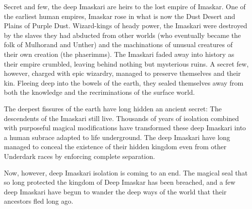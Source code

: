 
Secret and few, the deep Imaskari are heirs to the lost empire of Imaskar. One of the earliest human empires, Imaskar rose in what is now the Dust Desert and Plains of Purple Dust. Wizard-kings of heady power, the Imaskari were destroyed by the slaves they had abducted from other worlds (who eventually became the folk of Mulhorand and Unther) and the machinations of unusual creatures of their own creation (the phaerimms). The Imaskari faded away into history as their empire crumbled, leaving behind nothing but mysterious ruins. A secret few, however, charged with epic wizardry, managed to preserve themselves and their kin. Fleeing deep into the bowels of the earth, they sealed themselves away from both the knowledge and the recriminations of the surface world.

The deepest fissures of the earth have long hidden an ancient secret: The descendents of the Imaskari still live. Thousands of years of isolation combined with purposeful magical modifications have transformed these deep Imaskari into a human subrace adapted to life underground. The deep Imaskari have long managed to conceal the existence of their hidden kingdom even from other Underdark races by enforcing complete separation.

Now, however, deep Imaskari isolation is coming to an end. The magical seal that so long protected the kingdom of Deep Imaskar has been breached, and a few deep Imaskari have begun to wander the deep ways of the world that their ancestors fled long ago.

